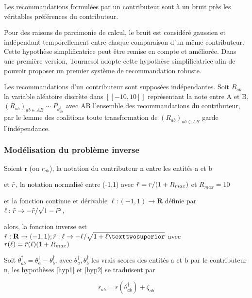 \begin{hypothesis}\label{hyp1}
Les recommandations formulées par un contributeur sont à un bruit près les véritables préférences du contributeur.
\end{hypothesis}
\begin{hypothesis}\label{hyp2}
Pour des raisons de parcimonie de calcul, le bruit est considéré gaussien et indépendant temporellement entre chaque comparaison d'un même contributeur. Cette hypothèse simplificatrice peut être remise en compte et améliorée. Dans une première version, Tournesol adopte cette hypothèse simplificatrice afin de pouvoir proposer un premier système de recommandation robuste.
\end{hypothesis}

\begin{hypothesis}\label{hyp3}

Les recommandations d'un contributeur sont supposées indépendantes. Soit $R_{ab}$ la variable aléatoire discrète dans $[\![-10,10]\!]$ représentant la note entre A et B, $(R_{ab})_{ab \in AB} \sim P_{\theta^\dagger_{ab}}$ avec AB l'ensemble des recommandations du contributeur, par le lemme des coalitions toute transformation de  $(R_{ab})_{ab \in AB}$ garde l'indépendance.

\end{hypothesis}


\subsubsection{Modélisation du problème inverse}
Soient r (ou $r_{ab}$), la notation du contributeur n entre les entités a et b

et $\Tilde{r}$, la notation normalisé entre (-1,1) avec $\Tilde{r} =r/(1+R_{max})$ et $R_{max}=10$

et la fonction continue et dérivable $\ell : (-1,1) \rightarrow \mathbf{R}$ définie par $\ell : \Tilde{r} \rightarrow -\Tilde{r}/\sqrt{1-\Tilde{r}^2}$,

alors, la fonction inverse est $\Tilde{r} : \mathbf{R} \rightarrow  (-1,1) ; \Tilde{r} : \ell \rightarrow -\ell / \sqrt{1+\ell²} $ avec $r(\ell)= \Tilde{r}(\ell)(1+R_{max})$

Soit $\theta_{ab}^\dagger=\theta_a^\dagger-\theta_b^\dagger$, avec $\theta_a^\dagger, \theta_b^\dagger$ les vrais scores des entités a et b par le contributeur n, les hypothèses  \ref{hyp1} et \ref{hyp2} se traduisent par

\begin{equation}
r_{ab}=r(\theta_{ab}^\dagger)+\zeta_{ab}    
\end{equation}


